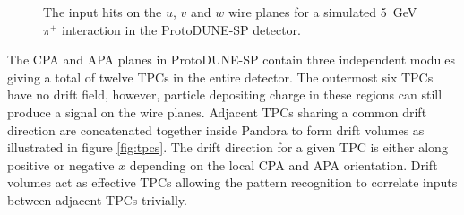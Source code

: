 \begin{figure}
\centering
{}
\caption{The input hits on the \protect{} $u$, \protect{} $v$ and \protect{} $w$ wire planes for a simulated 5~GeV $\pi^{+}$ interaction in the ProtoDUNE-SP detector.}
\label{fig:inputhits}
\end{figure}

The CPA and APA planes in ProtoDUNE-SP contain three independent modules giving a total of twelve TPCs in the entire detector.  The outermost six TPCs have no drift field, however, particle depositing charge in these regions can still produce a signal on the wire planes.  Adjacent TPCs sharing a common drift direction are concatenated together inside Pandora to form drift volumes as illustrated in figure \ref{fig:tpcs}.  The drift direction for a given TPC is either along positive or negative $x$ depending on the local CPA and APA orientation.  Drift volumes act as effective TPCs allowing the pattern recognition to correlate inputs between adjacent TPCs trivially.

